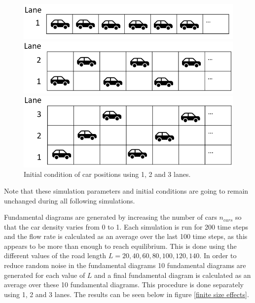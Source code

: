 \documentclass[a4paper,12pt]{article}
\begin{document}
\begin{figure}[H]
    \centering
    \begin{minipage}{1\textwidth}
        \centering
        \includegraphics[scale=0.5]{Images/ic 1 lane.png}
    \end{minipage}

    \centering
    \begin{minipage}{1\textwidth}
        \centering
        \includegraphics[scale=0.5]{Images/ic 2 lanes.png}
    \end{minipage}

    \centering
    \begin{minipage}{1\textwidth}
        \centering
        \includegraphics[scale=0.5]{Images/ic 3 lanes.png}
    \end{minipage}%
    \caption{Initial condition of car positions using 1, 2 and 3 lanes.}
    \label{initial conditions}
\end{figure}

Note that these simulation parameters and initial conditions are going to remain unchanged during all following simulations.

Fundamental diagrams are generated by increasing the number of cars $n_{cars}$ so that the car density varies from 0 to 1. 
Each simulation is run for 200 time steps and the flow rate is calculated as an average over the last 100 time steps, as this appears to be 
more than enough to reach equilibrium.
This is done using the different values of the road length $L=20, 40, 60, 80, 100, 120, 140$. In order to reduce random noise in the fundamental diagrams
10 fundamental diagrams are generated for each value of $L$ and a final fundamental diagram is calculated as an average over these 10 fundamental diagrams.
This procedure is done separately using 1, 2 and 3 lanes.
The results can be seen below in figure \ref*{finite size effects}.
\end{document}
